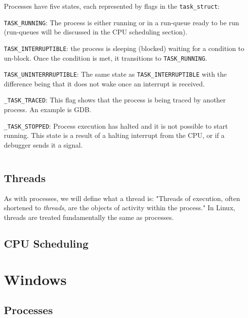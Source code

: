 \documentclass[10pt,letterpaper,onecolumn,draftclsnofoot]{IEEEtran}
\begin{document}
Processes have five states, each represented by flags in the
\texttt{task\_struct}:

\begin{description}
  \item \texttt{TASK\_RUNNING}: The process is either running or in a run-queue
  ready to be run (run-queues will be discussed in the CPU scheduling section).
  \item \texttt{TASK\_INTERRUPTIBLE}: the process is sleeping (blocked) waiting
  for a condition to un-block. Once the condition is met, it transitions to
  \texttt{TASK\_RUNNING}.
  \item \texttt{TASK\_UNINTERRRUPTIBLE}: The same state as \texttt{TASK\_INTERRUPTIBLE}
  with the difference being that it does not wake once an interrupt is received.
  \item \texttt{\_TASK\_TRACED}: This flag shows that the process is being traced
  by another process. An example is GDB.
  \item \texttt{\_TASK\_STOPPED}: Process execution has halted and it is not
  possible to start running. This state is a result of a halting interrupt from
  the CPU, or if a debugger sends it a signal.

\end{description}

 \begin{lstlisting}

 \end{lstlisting}

  \subsection{Threads}
As with processes, we will define what a thread is: "Threads of execution, often
shortened to \textit{threads}, are the objects of activity within the process."
\cite{robertlove2010} In Linux, threads are treated fundamentally the same as
processes.

  \subsection{CPU Scheduling}

\section{Windows}
  \subsection{Processes}
\end{document}

